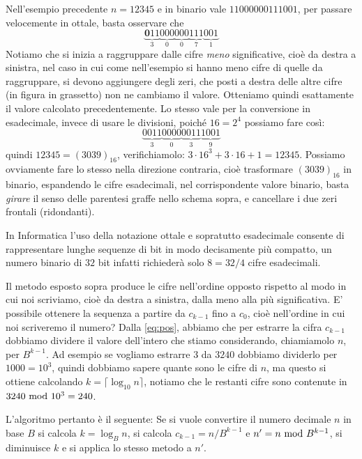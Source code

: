 \begin{ex}
Nell'esempio precedente $n=12345$ e in binario vale $11000000111001$, per passare velocemente in ottale, basta osservare che
\[
\underbrace{\mathbf{0}11}_{3}\underbrace{000}_{0}\underbrace{000}_{0}\underbrace{111}_{7}\underbrace{001}_{1}
\]
\noindent Notiamo che si inizia a raggruppare dalle cifre \emph{meno} significative, cioè da destra a sinistra, nel caso in cui come nell'esempio si hanno meno cifre di quelle da raggruppare, si devono aggiungere degli zeri, che posti a destra delle altre cifre (in figura in grassetto) non ne cambiamo il valore. Otteniamo
quindi esattamente il valore calcolato precedentemente. Lo stesso vale per la conversione in esadecimale, invece di usare le divisioni, poiché $16 = 2^4$ possiamo fare così:
\[
\underbrace{0011}_{3}\underbrace{0000}_{0}\underbrace{0011}_{3}\underbrace{1001}_{9}
\]
quindi $12345 = (3039)_{16}$, verifichiamolo: $3\cdot{16}^3+3\cdot{16}+1 = 12345$. Possiamo ovviamente fare lo stesso nella direzione contraria, cioè trasformare $(3039)_{16}$ in binario, espandendo le cifre esadecimali, nel corrispondente valore binario, basta \emph{girare} il senso delle parentesi graffe nello schema sopra, e cancellare i due zeri frontali (ridondanti).
\end{ex}

In Informatica l'uso della notazione ottale e sopratutto esadecimale consente
di rappresentare lunghe sequenze di bit in modo decisamente più compatto, un
numero binario di $32$ bit infatti richiederà solo $8 = 32/4$ cifre esadecimali.

Il metodo esposto sopra produce le cifre nell'ordine opposto rispetto al modo in cui noi scriviamo,  
cioè da destra a sinistra, dalla meno alla più significativa. E' possibile ottenere la sequenza a partire da $c_{k-1}$ fino
a $c_0$, cioè nell'ordine in cui noi scriveremo il numero? Dalla \eqref{eq:pos},
abbiamo che per estrarre la cifra $c_{k-1}$ dobbiamo dividere il valore dell'intero che stiamo considerando, chiamiamolo $n$, per $B^{k-1}$. Ad esempio
se vogliamo estrarre $3$ da $3240$ dobbiamo dividerlo per $1000 = 10^3$, quindi dobbiamo sapere quante sono le cifre di $n$, ma questo si ottiene calcolando
$k = \lceil \log_{10} n \rceil$, notiamo che le restanti cifre sono contenute in $3240 \ \text{mod}\ 10^3 = 240$.

L'algoritmo pertanto è il seguente: Se si vuole convertire il numero decimale $n$ in base $B$ si calcola $k = \log_B n$, si calcola $c_{k-1} = n / B^{k-1}$ e $n' = n \ \text{mod}\ B^{k-1}$, si diminuisce $k$ e si applica lo stesso metodo a $n'$.

